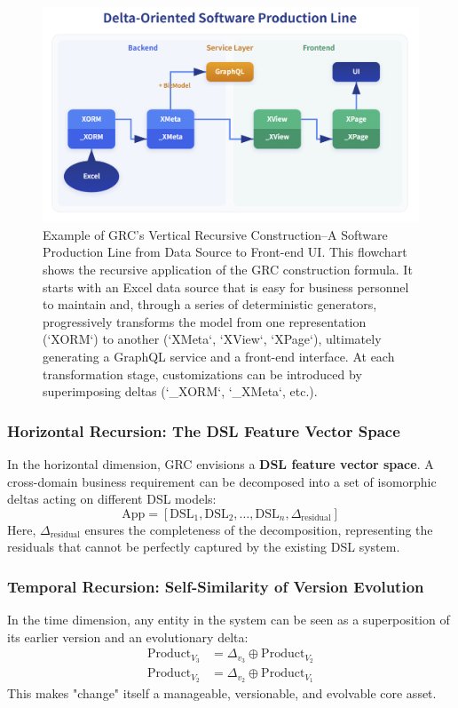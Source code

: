 \documentclass[11pt]{article}
\begin{document}
\begin{figure}[htbp]
    \centering
    \includegraphics[width=\textwidth]{ddd/delta-pipe-line.png}
    \caption{Example of GRC's Vertical Recursive Construction--A Software Production Line from Data Source to Front-end UI. This flowchart shows the recursive application of the GRC construction formula. It starts with an Excel data source that is easy for business personnel to maintain and, through a series of deterministic generators, progressively transforms the model from one representation (`XORM`) to another (`XMeta`, `XView`, `XPage`), ultimately generating a GraphQL service and a front-end interface. At each transformation stage, customizations can be introduced by superimposing deltas (`\_XORM`, `\_XMeta`, etc.).}
    \label{fig:delta_prod_line}
\end{figure}

\subsubsection{Horizontal Recursion: The DSL Feature Vector Space}
In the horizontal dimension, GRC envisions a \textbf{DSL feature vector space}. A cross-domain business requirement can be decomposed into a set of isomorphic deltas acting on different DSL models:
\[
\text{App} = [\text{DSL}_1, \text{DSL}_2, \dots, \text{DSL}_n, \Delta_{\text{residual}}]
\]
Here, $\Delta_{\text{residual}}$ ensures the completeness of the decomposition, representing the residuals that cannot be perfectly captured by the existing DSL system.

\subsubsection{Temporal Recursion: Self-Similarity of Version Evolution}
In the time dimension, any entity in the system can be seen as a superposition of its earlier version and an evolutionary delta:
\begin{align*}
\text{Product}_{V_3} &= \Delta_{v_3} \oplus \text{Product}_{V_2} \\
\text{Product}_{V_2} &= \Delta_{v_2} \oplus \text{Product}_{V_1}
\end{align*}
This makes "change" itself a manageable, versionable, and evolvable core asset.
\end{document}
